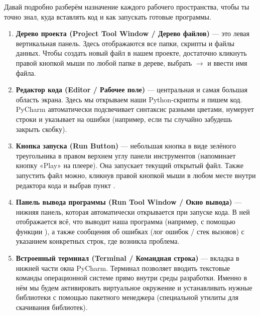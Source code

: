 Давай подробно разберём назначение каждого рабочего пространства, чтобы ты точно знал, куда вставлять код и как запускать готовые программы.

\begin{enumerate}
    \item \textbf{Дерево проекта (Project Tool Window / Дерево файлов)} — это левая вертикальная панель. Здесь отображаются все папки, скрипты и файлы данных. Чтобы создать новый файл в нашем проекте, достаточно кликнуть правой кнопкой мыши по любой папке в дереве, выбрать  $\rightarrow$  и ввести имя файла.
    \item \textbf{Редактор кода (Editor / Рабочее поле)} — центральная и самая большая область экрана. Здесь мы открываем наши Python-скрипты и пишем код. PyCharm автоматически подсвечивает синтаксис разными цветами, нумерует строки и указывает на ошибки (например, если ты случайно забудешь закрыть скобку).
    \item \textbf{Кнопка запуска (Run Button)} — небольшая кнопка в виде зелёного треугольника в правом верхнем углу панели инструментов (напоминает кнопку «Play» на плеере). Она запускает текущий открытый файл. Также запустить файл можно, кликнув правой кнопкой мыши в любом месте внутри редактора кода и выбрав пункт .
    \item \textbf{Панель вывода программы (Run Tool Window / Окно вывода)} — нижняя панель, которая автоматически открывается при запуске кода. В ней отображается всё, что выводит наша программа (например, с помощью функции ), а также сообщения об ошибках (лог ошибок / стек вызовов) с указанием конкретных строк, где возникла проблема.
    \item \textbf{Встроенный терминал (Terminal / Командная строка)} — вкладка в нижней части окна PyCharm. Терминал позволяет вводить текстовые команды операционной системе прямо внутри среды разработки. Именно в нём мы будем активировать виртуальное окружение и устанавливать нужные библиотеки с помощью пакетного менеджера (специальной утилиты для скачивания библиотек).
\end{enumerate}




